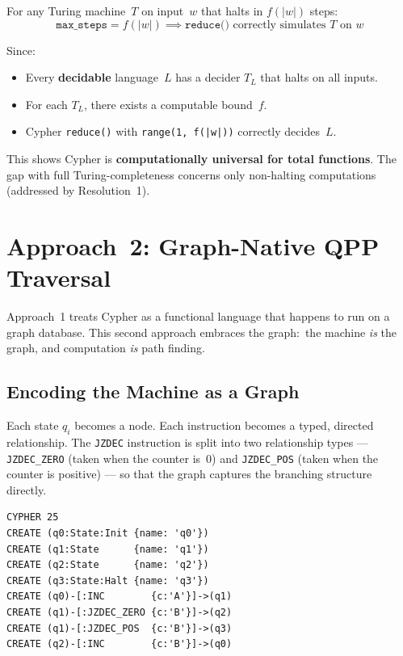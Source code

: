 \documentclass[11pt,a4paper]{article}
\begin{document}
For any Turing machine~$T$ on input~$w$ that halts in $f(|w|)$ steps:
\[
  \texttt{max\_steps} = f(|w|) \implies
  \texttt{reduce()} \text{ correctly simulates } T \text{ on } w
\]

Since:
\begin{itemize}[leftmargin=1.5em]
  \item Every \textbf{decidable} language~$L$ has a decider $T_L$ that
        halts on all inputs.
  \item For each $T_L$, there exists a computable bound~$f$.
  \item Cypher \texttt{reduce()} with \texttt{range(1, f(|w|))} correctly
        decides~$L$.
\end{itemize}

This shows Cypher is \textbf{computationally universal for total
functions}. The gap with full Turing-completeness concerns only
non-halting computations (addressed by Resolution~1).


\section{Approach~2: Graph-Native QPP Traversal}

Approach~1 treats Cypher as a functional language that happens to run on
a graph database. This second approach embraces the graph:\ the machine
\emph{is} the graph, and computation \emph{is} path finding.

\subsection{Encoding the Machine as a Graph}

Each state $q_i$ becomes a node. Each instruction becomes a typed,
directed relationship. The \texttt{JZDEC} instruction is split into two
relationship types --- \texttt{JZDEC\_ZERO} (taken when the counter
is~$0$) and \texttt{JZDEC\_POS} (taken when the counter is positive) ---
so that the graph captures the branching structure directly.

\begin{codeblock}
\begin{lstlisting}
CYPHER 25
CREATE (q0:State:Init {name: 'q0'})
CREATE (q1:State      {name: 'q1'})
CREATE (q2:State      {name: 'q2'})
CREATE (q3:State:Halt {name: 'q3'})
CREATE (q0)-[:INC        {c:'A'}]->(q1)
CREATE (q1)-[:JZDEC_ZERO {c:'B'}]->(q2)
CREATE (q1)-[:JZDEC_POS  {c:'B'}]->(q3)
CREATE (q2)-[:INC        {c:'B'}]->(q0)
\end{lstlisting}
\end{codeblock}
\end{document}
